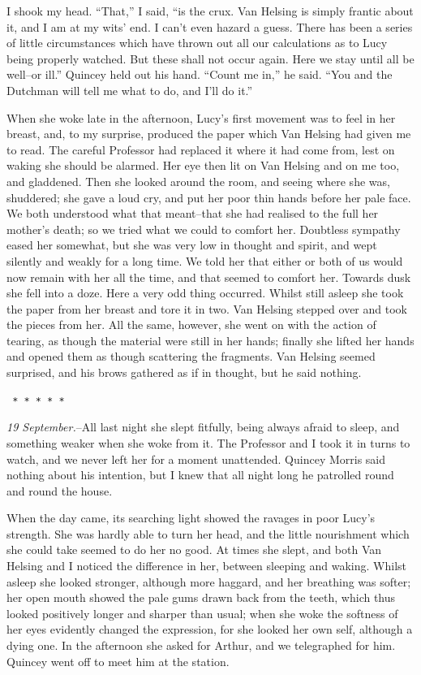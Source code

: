 \documentclass[12pt,openright]{book}
\begin{document}
I shook my head. “That,” I said, “is the crux. Van Helsing is simply frantic about it, and I am at my wits’ end. I can’t even hazard a guess. There has been a series of little circumstances which have thrown out all our calculations as to Lucy being properly watched. But these shall not occur again. Here we stay until all be well–or ill.” Quincey held out his hand. “Count me in,” he said. “You and the Dutchman will tell me what to do, and I’ll do it.”

When she woke late in the afternoon, Lucy’s first movement was to feel in her breast, and, to my surprise, produced the paper which Van Helsing had given me to read. The careful Professor had replaced it where it had come from, lest on waking she should be alarmed. Her eye then lit on Van Helsing and on me too, and gladdened. Then she looked around the room, and seeing where she was, shuddered; she gave a loud cry, and put her poor thin hands before her pale face. We both understood what that meant–that she had realised to the full her mother’s death; so we tried what we could to comfort her. Doubtless sympathy eased her somewhat, but she was very low in thought and spirit, and wept silently and weakly for a long time. We told her that either or both of us would now remain with her all the time, and that seemed to comfort her. Towards dusk she fell into a doze. Here a very odd thing occurred. Whilst still asleep she took the paper from her breast and tore it in two. Van Helsing stepped over and took the pieces from her. All the same, however, she went on with the action of tearing, as though the material were still in her hands; finally she lifted her hands and opened them as though scattering the fragments. Van Helsing seemed surprised, and his brows gathered as if in thought, but he said nothing.

\texttt{   *       *       *       *       *}

\textit{19 September.}–All last night she slept fitfully, being always afraid to sleep, and something weaker when she woke from it. The Professor and I took it in turns to watch, and we never left her for a moment unattended. Quincey Morris said nothing about his intention, but I knew that all night long he patrolled round and round the house.

When the day came, its searching light showed the ravages in poor Lucy’s strength. She was hardly able to turn her head, and the little nourishment which she could take seemed to do her no good. At times she slept, and both Van Helsing and I noticed the difference in her, between sleeping and waking. Whilst asleep she looked stronger, although more haggard, and her breathing was softer; her open mouth showed the pale gums drawn back from the teeth, which thus looked positively longer and sharper than usual; when she woke the softness of her eyes evidently changed the expression, for she looked her own self, although a dying one. In the afternoon she asked for Arthur, and we telegraphed for him. Quincey went off to meet him at the station.
\end{document}
